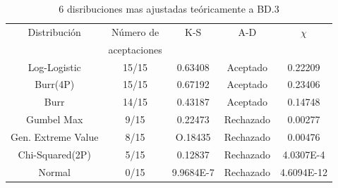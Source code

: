 \documentclass[12pt]{report}
\begin{document}
\begin{table}[h!]
	\centering
	\begin{tabular}{|c|c|c|c|c|}			
		\hline
		Distribución	  &Número de	&K-S	&A-D	& $\chi$  \\
		&	aceptaciones &     &	 &     \\ \hline
		Log-Logistic    &    15/15    & 0.63408   & 	Aceptado     &0.22209    \\ \hline
		Burr(4P) &    15/15	& 0.67192    &  Aceptado   	& 0.23406   \\ \hline
		Burr &    14/15	& 0.43187	&  Aceptado 	&   0.14748	\\ \hline 
		Gumbel Max  &    9/15	& 0.22473  &   Rechazado	& 0.00277   	\\ \hline
		Gen. Extreme Value  &   8/15	&     O.18435   &      	Rechazado   &  0.00476	\\ \hline
		Chi-Squared(2P)   &   5/15	& 0.12837    &   	Rechazado	& 4.0307E-4   	\\ \hline
		Normal   &   0/15	& 9.9684E-7    &   	Rechazado	& 4.6094E-12	\\ \hline %
	\end{tabular}
	\caption{6 disribuciones mas ajustadas teóricamente a BD.3}
	\label{teo_BD3}
\end{table}
\end{document}
